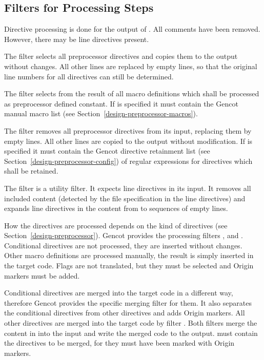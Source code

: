 \subsection{Filters for Processing Steps}

Directive processing is done for the output of . All comments have been removed. 
However, there may be line directives present. 

The filter  selects all preprocessor directives and
copies them to the output without changes. All other lines are replaced by empty lines, so that the original
line numbers for all directives can still be determined. 

The filter  selects from the result of  all macro definitions
which shall be processed as preprocessor defined constant. If  is specified it must 
contain the Gencot manual macro list (see Section~\ref{design-preprocessor-macros}).

The filter  removes all preprocessor directives from its input, replacing them by empty
lines. All other lines are copied to the output without modification. If  is specified it must 
contain the Gencot directive retainment list (see Section~\ref{design-preprocessor-config}) of regular 
expressions for directives which shall be retained.

The filter  is a utility filter. It expects line directives in its input. It removes all
included content (detected by the file specification in the line directives) and expands line directives
in the content from  to sequences of empty lines.

How the directives are processed depends on the kind of directives (see Section~\ref{design-preprocessor}).
Gencot provides the processing filters ,  and . 
Conditional directives are not processed, they are inserted without changes. Other macro
definitions are processed manually, the result is simply inserted in the target code. Flags are not translated,
but they must be selected and Origin markers must be added.

Conditional directives are merged into the target code in a different way, therefore Gencot provides 
the specific merging filter  for them. It also separates the conditional
directives from other directives and adds Origin markers. All other directives are merged into the 
target code by filter . Both filters merge the content in  
into the input and write the merged code to the output.  must contain the directives to be merged,
for  they must have been marked with Origin markers.

